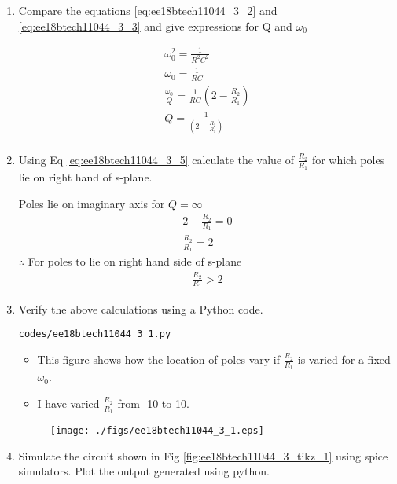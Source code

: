 \begin{enumerate}[label=\thesubsection.\arabic*.,ref=\thesubsection.\theenumi]
\item 
Compare the equations \ref{eq:ee18btech11044_3_2} and \ref{eq:ee18btech11044_3_3} and give expressions for Q and $\omega_0$

\solution
\begin{align}
    \omega_0^2 = \frac{1}{R^2C^2} \\
    \omega_0 = \frac{1}{RC} \label{eq:ee18btech11044_3_4} \\
    \frac{\omega_0}{Q} = \frac{1}{RC}(2 - \frac{R_2}{R_1}) \\
    Q = \frac{1}{(2 - \frac{R_2}{R_1})} \label{eq:ee18btech11044_3_5} \\
\end{align}
\item 
Using Eq \ref{eq:ee18btech11044_3_5} calculate the value of $\frac{R_2}{R_1}$ for which poles lie on right hand of s-plane.

\solution 

Poles lie on imaginary axis for $Q = \infty$
\begin{align}
    2 - \frac{R_2}{R_1} = 0 \\
    \frac{R_2}{R_1} = 2
\end{align}
$\therefore$ For poles to lie on right hand side of s-plane
\begin{align}
    \frac{R_2}{R_1} >2
\end{align}


\item
Verify the above calculations using a Python code.

\solution
\begin{lstlisting}
codes/ee18btech11044_3_1.py
\end{lstlisting}
\begin{itemize}
    \item This figure shows how the location of poles vary if $\frac{R_2}{R_1}$ is varied for a fixed $\omega_0$.
    \item I have varied $\frac{R_2}{R_1}$ from -10 to 10. 
\end{itemize}

\begin{figure}[!ht]
\centering
\texttt{[image: ./figs/ee18btech11044\_3\_1.eps]}
\caption{}
\end{figure}


\item Simulate the circuit shown in Fig \ref{fig:ee18btech11044_3_tikz_1} using spice simulators. Plot the output generated using python.


\end{enumerate}
